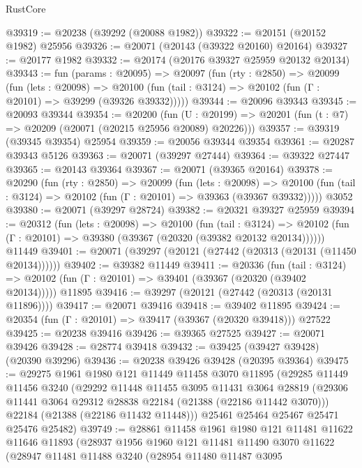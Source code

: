 \begin{lexlean}{RustCore}
\begin{coremodule}
@39319 := @20238 (@39292 (@20088 @1982))
@39322 := @20151 (@20152 @1982) @25956
@39326 := @20071 (@20143 (@39322 @20160) @20164)
@39327 := @20177 @1982
@39332 := @20174 (@20176 @39327 @25959 @20132 @20134)
@39343 := fun (params : @20095) =>
  @20097
    (fun (rty : @2850) =>
    @20099
      (fun (lets : @20098) =>
      @20100 (fun (tail : @3124) => @20102 (fun (Γ : @20101) => @39299 (@39326 @39332)))))
@39344 := @20096 @39343
@39345 := @20093 @39344
@39354 := @20200
    (fun (U : @20199) => @20201 (fun (t : @7) => @20209 (@20071 (@20215 @25956 @20089) @20226)))
@39357 := @39319 (@39345 @39354) @25954
@39359 := @20056 @39344 @39354
@39361 := @20287 @39343 @5126
@39363 := @20071 (@39297 @27444)
@39364 := @39322 @27447
@39365 := @20143 @39364
@39367 := @20071 (@39365 @20164)
@39378 := @20290
    (fun (rty : @2850) =>
    @20099
      (fun (lets : @20098) =>
      @20100 (fun (tail : @3124) => @20102 (fun (Γ : @20101) => @39363 (@39367 @39332)))))
    @3052
@39380 := @20071 (@39297 @28724)
@39382 := @20321 @39327 @25959
@39394 := @20312
    (fun (lets : @20098) =>
    @20100
      (fun (tail : @3124) =>
      @20102 (fun (Γ : @20101) => @39380 (@39367 (@20320 (@39382 @20132 @20134))))))
    @11449
@39401 := @20071 (@39297 (@20121 (@27442 (@20313 (@20131 (@11450 @20134))))))
@39402 := @39382 @11449
@39411 := @20336
    (fun (tail : @3124) => @20102 (fun (Γ : @20101) => @39401 (@39367 (@20320 (@39402 @20134)))))
    @11895
@39416 := @39297 (@20121 (@27442 (@20313 (@20131 @11896))))
@39417 := @20071 @39416
@39418 := @39402 @11895
@39424 := @20354 (fun (Γ : @20101) => @39417 (@39367 (@20320 @39418))) @27522
@39425 := @20238 @39416
@39426 := @39365 @27525
@39427 := @20071 @39426
@39428 := @28774 @39418
@39432 := @39425 (@39427 @39428) (@20390 @39296)
@39436 := @20238 @39426 @39428 (@20395 @39364)
@39475 := @29275
    @1961
    @1980
    @121
    @11449
    @11458
    @3070
    @11895
    (@29285
      @11449
      @11456
      @3240
      (@29292
        @11448
        @11455
        @3095
        @11431
        @3064
        @28819
        (@29306 @11441 @3064 @29312 @28838 @22184 (@21388 (@22186 @11442 @3070)))
        @22184
        (@21388 (@22186 @11432 @11448)))
      @25461
      @25464
      @25467
      @25471
      @25476
      @25482)
@39749 := @28861
    @11458
    @1961
    @1980
    @121
    @11481
    @11622
    @11646
    @11893
    (@28937
      @1956
      @1960
      @121
      @11481
      @11490
      @3070
      @11622
      (@28947
        @11481
        @11488
        @3240
        (@28954
          @11480
          @11487
          @3095

\end{coremodule}
\end{lexlean}

